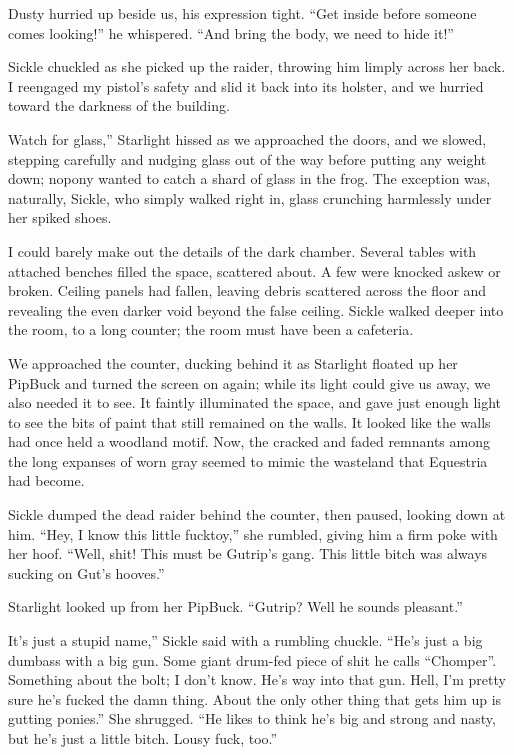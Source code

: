 Dusty hurried up beside us, his expression tight. “Get inside before someone comes looking!” he whispered. “And bring the body, we need to hide it!”

Sickle chuckled as she picked up the raider, throwing him limply across her back. I reengaged my pistol’s safety and slid it back into its holster, and we hurried toward the darkness of the building.

\leavevmode{}Watch for glass,” Starlight hissed as we approached the doors, and we slowed, stepping carefully and nudging glass out of the way before putting any weight down; nopony wanted to catch a shard of glass in the frog. The exception was, naturally, Sickle, who simply walked right in, glass crunching harmlessly under her spiked shoes.

I could barely make out the details of the dark chamber. Several tables with attached benches filled the space, scattered about. A few were knocked askew or broken. Ceiling panels had fallen, leaving debris scattered across the floor and revealing the even darker void beyond the false ceiling. Sickle walked deeper into the room, to a long counter; the room must have been a cafeteria.

We approached the counter, ducking behind it as Starlight floated up her PipBuck and turned the screen on again; while its light could give us away, we also needed it to see. It faintly illuminated the space, and gave just enough light to see the bits of paint that still remained on the walls. It looked like the walls had once held a woodland motif. Now, the cracked and faded remnants among the long expanses of worn gray seemed to mimic the wasteland that Equestria had become.

Sickle dumped the dead raider behind the counter, then paused, looking down at him. “Hey, I know this little fucktoy,” she rumbled, giving him a firm poke with her hoof. “Well, shit! This must be Gutrip’s gang. This little bitch was always sucking on Gut’s hooves.”

Starlight looked up from her PipBuck. “Gutrip? Well he sounds pleasant.”

\leavevmode{}It’s just a stupid name,” Sickle said with a rumbling chuckle. “He’s just a big dumbass with a big gun. Some giant drum-fed piece of shit he calls “Chomper”. Something about the bolt; I don’t know. He’s way into that gun. Hell, I’m pretty sure he’s fucked the damn thing. About the only other thing that gets him up is gutting ponies.” She shrugged. “He likes to think he’s big and strong and nasty, but he’s just a little bitch. Lousy fuck, too.”

